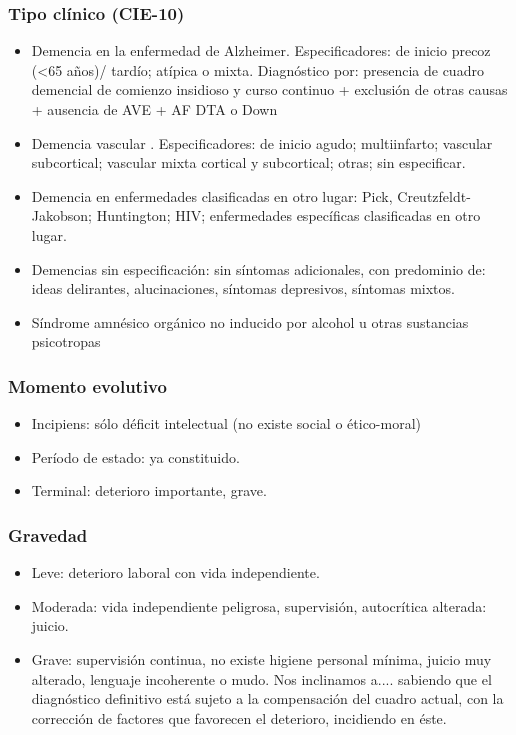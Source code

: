 \subsubsection*{Tipo clínico (CIE-10)}
\begin{itemize}
	\item Demencia en la enfermedad de Alzheimer. Especificadores: de inicio precoz (<65 años)/ tardío; atípica o mixta. Diagnóstico por: presencia de cuadro demencial de comienzo insidioso y curso continuo + exclusión de otras causas + ausencia de AVE + AF DTA o Down
	\item Demencia vascular . Especificadores: de inicio agudo; multiinfarto; vascular subcortical; vascular mixta cortical y subcortical; otras; sin especificar.
	\item Demencia en enfermedades clasificadas en otro lugar: Pick, Creutzfeldt-Jakobson; Huntington; HIV; enfermedades específicas clasificadas en otro lugar.
	\item Demencias sin especificación: sin síntomas adicionales, con predominio de: ideas delirantes, alucinaciones, síntomas depresivos, síntomas mixtos.
	\item Síndrome amnésico orgánico no inducido por alcohol u otras sustancias psicotropas
\end{itemize}
\subsubsection*{Momento evolutivo}
\begin{itemize}
	\item Incipiens: sólo déficit intelectual (no existe social o ético-moral)
	\item Período de estado: ya constituido.
	\item Terminal: deterioro importante, grave.
\end{itemize}
\subsubsection*{Gravedad}
\begin{itemize}
	\item Leve: deterioro laboral con vida independiente.
	\item Moderada: vida independiente peligrosa, supervisión, autocrítica alterada: juicio.
	\item Grave: supervisión continua, no existe higiene personal mínima, juicio muy alterado, lenguaje incoherente o mudo. Nos inclinamos a.... sabiendo que el diagnóstico definitivo está sujeto a la compensación del cuadro actual, con la corrección de factores que favorecen el deterioro, incidiendo en éste.
\end{itemize}
